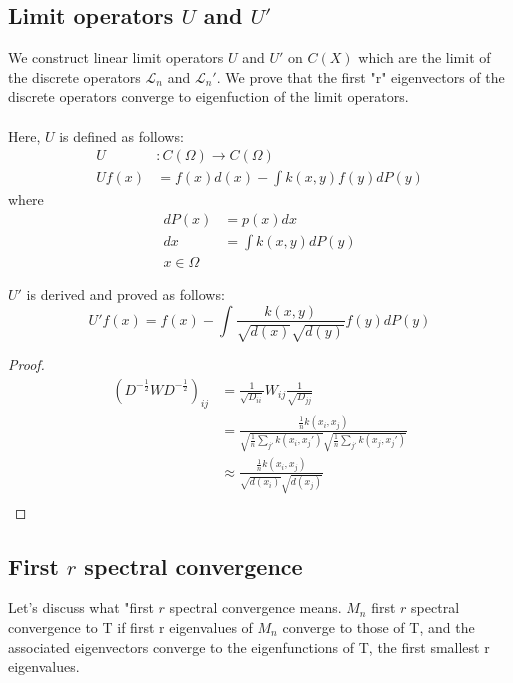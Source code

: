\documentclass[12pt]{article}
\theoremstyle{plain}
\begin{document}
\subsection{Limit operators $U$ and $U'$}
We construct linear limit operators $U$ and $U'$ on $C(X)$ which are the limit of the discrete operators $\mathcal{L}_n$ and $\mathcal{L}_n'$. We prove that the first "r" eigenvectors of the discrete operators converge to eigenfuction  of the limit operators. 
\\ \\
Here, $U$ is defined as follows:
\begin{align*}
  U &: C(\Omega) \to C(\Omega) \\
  Uf(x) &= f(x)d(x) - \int k(x, y) f(y) dP(y)
\end{align*}
where
\begin{align*}
  dP(x) &= p(x)dx \\
  dx &= \int k(x, y) dP(y) \\
  x \in \Omega
\end{align*}

$U'$ is derived and proved as follows:
\[
U' f(x) = f(x) - \int{ \frac{ k(x, y) }{ \sqrt{ d(x) } \sqrt{ d(y) } } f(y) dP(y) }
\]

\begin{proof}

  \begin{align*}
    (D^{-\frac{1}{2}} W D^{-\frac{1}{2}})_{ij} &= \frac{1}{\sqrt{D_{ii}}} W_{ij} \frac{1}{\sqrt{D_{jj}}} \\
    &= \frac{ \frac{1}{n} k(x_i, x_j) }{ \sqrt{ \frac{1}{n} \sum_{j'} k(x_i, x_j') } \sqrt{ \frac{1}{n} \sum_{j'} k(x_j, x_j') } } \\
    &\approx \frac{ \frac{1}{n} k(x_i, x_j) }{ \sqrt{d(x_i)} \sqrt{d(x_j)} } \\
  \end{align*}

\end{proof}

\subsection{First $ r $ spectral convergence}

Let's discuss what "first $r$ spectral convergence means. $ M_n $ first $r$ spectral convergence to T if first r eigenvalues of $ M_n $ converge to those of T, and the associated eigenvectors converge to the eigenfunctions of T, the first smallest r eigenvalues.
\end{document}
